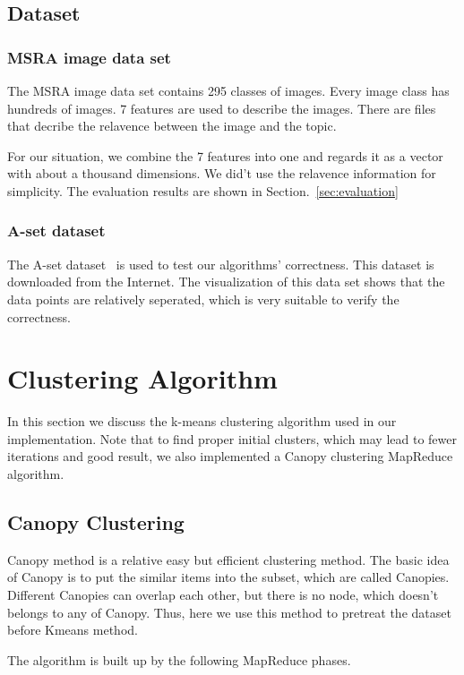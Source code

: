 \documentclass[a4paper,11pt]{article}
\begin{document}
\subsection{Dataset}
\subsubsection{MSRA image data set}
The MSRA image data set contains 295 classes of images. Every image class
has hundreds of images. 7 features are used to describe the images. There are
files that decribe the relavence between the image and the topic.

For our situation, we combine the 7 features into one and regards it as a vector
with about a thousand dimensions. We did't use the relavence information for
simplicity. The evaluation results are shown in Section.~\ref{sec:evaluation}
\subsubsection{A-set dataset}
The A-set dataset~\cite{dataset:aset} is used to test our algorithms'
correctness. This dataset is downloaded from the Internet. The visualization of
this data set shows that the data points are relatively seperated, which is very
suitable to verify the correctness.

\section{Clustering Algorithm}
In this section we discuss the k-means clustering algorithm used in our
implementation. Note that to find proper initial clusters, which may lead to
fewer iterations and good result, we also implemented a Canopy clustering
MapReduce algorithm.
\subsection{Canopy Clustering}
Canopy method is a relative easy but efficient clustering method. The basic 
idea of Canopy is to put the similar items into the subset, which are called 
Canopies. Different Canopies can overlap each other, but there is no node, 
which doesn't belongs to any of Canopy. Thus, here we use this method to 
pretreat the dataset before Kmeans method. 

The algorithm is built up by the following MapReduce phases.
\end{document}
